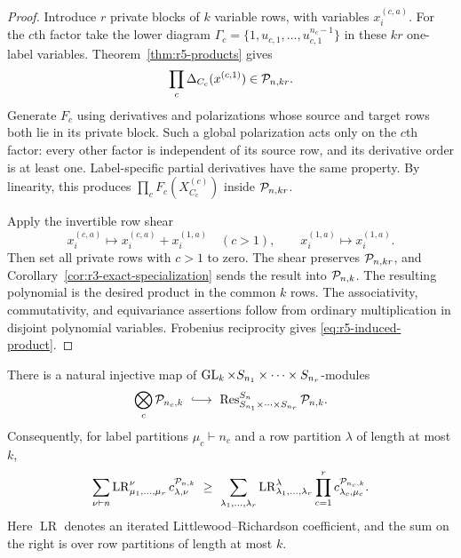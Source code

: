 \begin{proof}
Introduce $r$ private blocks of $k$ variable rows, with variables
$x_i^{(c,a)}$.  For the $c$th factor take the lower diagram
$\Gamma_c=\{1,u_{c,1},\ldots,u_{c,1}^{n_c-1}\}$ in these $kr$
one-label variables.  Theorem~\ref{thm:r5-products} gives
\[
                    \prod_c\Delta_{C_c}(x^{(c,1)})
                                      \in\mathcal P_{n,kr}.
\]
Generate $F_c$ using derivatives and polarizations whose source
and target rows both lie in its private block.  Such a global
polarization acts only on the $c$th factor: every other factor is
independent of its source row, and its derivative order is at least
one.  Label-specific partial derivatives have the same property.
By linearity, this produces
$\prod_c F_c(X_{C_c}^{(c)})$ inside $\mathcal P_{n,kr}$.

Apply the invertible row shear
\[
 x_i^{(c,a)}\longmapsto x_i^{(c,a)}+x_i^{(1,a)}\quad(c>1),
 \qquad x_i^{(1,a)}\longmapsto x_i^{(1,a)}.
\]
Then set all private rows with $c>1$ to zero.
The shear preserves $\mathcal P_{n,kr}$, and
Corollary~\ref{cor:r3-exact-specialization} sends the result into
$\mathcal P_{n,k}$.  The resulting polynomial is the desired product
in the common $k$ rows.  The associativity, commutativity, and
equivariance assertions follow from ordinary multiplication in
disjoint polynomial variables.  Frobenius reciprocity gives
\eqref{eq:r5-induced-product}.
\end{proof}

\begin{corollary}
\label{cor:r5-product-restriction}
There is a natural injective map of
$\operatorname{GL}_k\times S_{n_1}\times\cdots\times S_{n_r}$-modules
\[
 \bigotimes_c\Pol_{n_c,k}
   \ \lhook\joinrel\longrightarrow\
 \operatorname{Res}_{S_{n_1}\times\cdots\times S_{n_r}}^{S_n}
                                     \Pol_{n,k}.
\]
Consequently, for label partitions $\mu_c\vdash n_c$ and a row
partition $\lambda$ of length at most $k$,
\begin{equation}\label{eq:r5-product-lr}
 \sum_{\nu\vdash n}
       \operatorname{LR}_{\mu_1,\ldots,\mu_r}^{\nu}
                         c_{\lambda,\nu}^{\mathcal P_{n,k}}
 \ \geq\
 \sum_{\lambda_1,\ldots,\lambda_r}
       \operatorname{LR}_{\lambda_1,\ldots,\lambda_r}^{\lambda}
                     \prod_{c=1}^r
                       c_{\lambda_c,\mu_c}^{\mathcal P_{n_c,k}}.
\end{equation}
Here $\operatorname{LR}$ denotes an iterated Littlewood--Richardson
coefficient, and the sum on the right is over row partitions of
length at most $k$.
\end{corollary}

